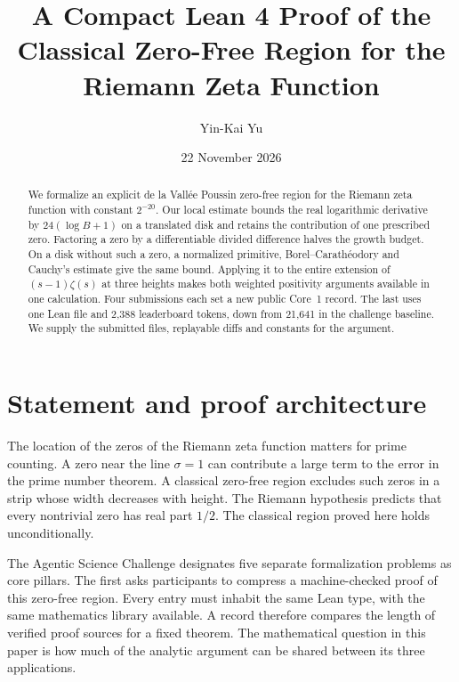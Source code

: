 \documentclass[11pt,a4paper]{article}
\title{A Compact Lean 4 Proof of the Classical Zero-Free Region for the Riemann Zeta Function}
\author{Yin-Kai Yu}
\date{22 November 2026}
\begin{document}
\maketitle
\begin{abstract}
We formalize an explicit de la Vall\'ee Poussin zero-free region for
the Riemann zeta function with constant \(2^{-20}\). Our local estimate
bounds the real logarithmic derivative by \(24(\log B+1)\) on a
translated disk and retains the contribution of one prescribed zero.
Factoring a zero by a differentiable divided difference halves the
growth budget. On a disk without such a zero, a normalized primitive,
Borel--Carath\'eodory and Cauchy's estimate give the same bound.
Applying it to the entire extension of \((s-1)\zeta(s)\) at three
heights makes both weighted positivity arguments available in one
calculation. Four submissions each set a new public Core~1 record.
The last uses one Lean file and
2,388 leaderboard tokens, down from 21,641 in the challenge baseline.
We supply the submitted files, replayable diffs and constants for the argument.
\end{abstract}

\section{Statement and proof architecture}
The location of the zeros of the Riemann zeta function matters for prime
counting. A zero near the line \(\sigma=1\) can contribute a large term
to the error in the prime number theorem. A classical zero-free region
excludes such zeros in a strip whose width decreases with height. The
Riemann hypothesis predicts that every nontrivial zero has real part
\(1/2\). The classical region proved here holds unconditionally.

The Agentic Science Challenge designates five separate formalization
problems as core pillars. The first asks participants to compress a
machine-checked proof of this zero-free region. Every entry must inhabit
the same Lean type, with the same mathematics library available. A
record therefore compares the length of verified proof sources for a
fixed theorem. The mathematical question in this paper is how much of
the analytic argument can be shared between its three applications.
\end{document}

